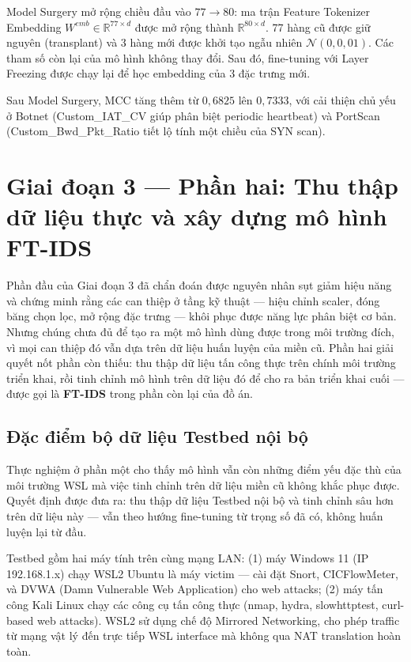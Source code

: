 \documentclass[../DoAn.tex]{subfiles}
\begin{document}
Model Surgery mở rộng chiều đầu vào $77 \rightarrow 80$: ma trận Feature Tokenizer Embedding $W^{emb} \in \mathbb{R}^{77 \times d}$ được mở rộng thành $\mathbb{R}^{80 \times d}$. 77 hàng cũ được giữ nguyên (transplant) và 3 hàng mới được khởi tạo ngẫu nhiên $\mathcal{N}(0, 0{,}01)$. Các tham số còn lại của mô hình không thay đổi. Sau đó, fine-tuning với Layer Freezing được chạy lại để học embedding của 3 đặc trưng mới.

Sau Model Surgery, MCC tăng thêm từ $0{,}6825$ lên $0{,}7333$, với cải thiện chủ yếu ở Botnet (Custom\_IAT\_CV giúp phân biệt periodic heartbeat) và PortScan (Custom\_Bwd\_Pkt\_Ratio tiết lộ tính một chiều của SYN scan).

\section{Giai đoạn 3 --- Phần hai: Thu thập dữ liệu thực và xây dựng mô hình FT-IDS}
\label{sec:gd4}

Phần đầu của Giai đoạn 3 đã chẩn đoán được nguyên nhân sụt giảm hiệu năng và chứng minh rằng các can thiệp ở tầng kỹ thuật --- hiệu chỉnh scaler, đóng băng chọn lọc, mở rộng đặc trưng --- khôi phục được năng lực phân biệt cơ bản. Nhưng chúng chưa đủ để tạo ra một mô hình dùng được trong môi trường đích, vì mọi can thiệp đó vẫn dựa trên dữ liệu huấn luyện của miền cũ. Phần hai giải quyết nốt phần còn thiếu: thu thập dữ liệu tấn công thực trên chính môi trường triển khai, rồi tinh chỉnh mô hình trên dữ liệu đó để cho ra bản triển khai cuối --- được gọi là \textbf{FT-IDS} trong phần còn lại của đồ án.

\subsection{Đặc điểm bộ dữ liệu Testbed nội bộ}
\label{subsec:gd4-data}

Thực nghiệm ở phần một cho thấy mô hình vẫn còn những điểm yếu đặc thù của môi trường WSL mà việc tinh chỉnh trên dữ liệu miền cũ không khắc phục được. Quyết định được đưa ra: thu thập dữ liệu Testbed nội bộ và tinh chỉnh sâu hơn trên dữ liệu này --- vẫn theo hướng fine-tuning từ trọng số đã có, không huấn luyện lại từ đầu.

Testbed gồm hai máy tính trên cùng mạng LAN: (1) máy Windows 11 (IP 192.168.1.x) chạy WSL2 Ubuntu là máy victim --- cài đặt Snort, CICFlowMeter, và DVWA (Damn Vulnerable Web Application) cho web attacks; (2) máy tấn công Kali Linux chạy các công cụ tấn công thực (nmap, hydra, slowhttptest, curl-based web attacks). WSL2 sử dụng chế độ Mirrored Networking, cho phép traffic từ mạng vật lý đến trực tiếp WSL interface mà không qua NAT translation hoàn toàn.
\end{document}
